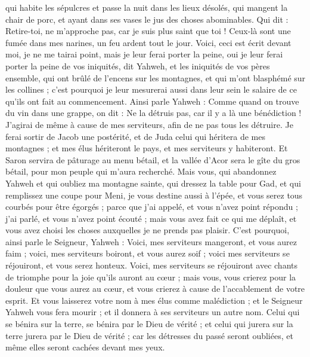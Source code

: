 \begin{multicols}{2}
qui habite les sépulcres et passe la nuit dans les lieux désolés, qui mangent la chair de porc, et ayant dans ses vases le jus des choses abominables.
Qui dit : Retire-toi, ne m'approche pas, car je suis plus saint que toi ! Ceux-là sont une fumée dans mes narines, un feu ardent tout le jour.
Voici, ceci est écrit devant moi, je ne me tairai point, mais je leur ferai porter la peine, oui je leur ferai porter la peine
de vos iniquités, dit Yahweh, et les iniquités de vos pères ensemble, qui ont brûlé de l'encens sur les montagnes, et qui m'ont blasphémé sur les collines ; c'est pourquoi je leur mesurerai aussi dans leur sein le salaire de ce qu'ils ont fait au commencement.
Ainsi parle Yahweh : Comme quand on trouve du vin dans une grappe, on dit : Ne la détruis pas, car il y a là une bénédiction ! J'agirai de même à cause de mes serviteurs, afin de ne pas tous les détruire.
Je ferai sortir de Jacob une postérité, et de Juda celui qui héritera de mes montagnes ; et mes élus hériteront le pays, et mes serviteurs y habiteront.
Et Saron servira de pâturage au menu bétail, et la vallée d'Acor sera le gîte du gros bétail, pour mon peuple qui m'aura recherché.
Mais vous, qui abandonnez Yahweh et qui oubliez ma montagne sainte, qui dressez la table pour Gad, et qui remplissez une coupe pour Meni,
je vous destine aussi à l'épée, et vous serez tous courbés pour être égorgés ; parce que j'ai appelé, et vous n'avez point répondu ; j'ai parlé, et vous n'avez point écouté ; mais vous avez fait ce qui me déplaît, et vous avez choisi les choses auxquelles je ne prends pas plaisir.
C'est pourquoi, ainsi parle le Seigneur, Yahweh : Voici, mes serviteurs mangeront, et vous aurez faim ; voici, mes serviteurs boiront, et vous aurez soif ; voici mes serviteurs se réjouiront, et vous serez honteux.
Voici, mes serviteurs se réjouiront avec chants de triomphe pour la joie qu'ils auront au cœur ; mais vous, vous crierez pour la douleur que vous aurez au cœur, et vous crierez à cause de l'accablement de votre esprit.
Et vous laisserez votre nom à mes élus comme malédiction ; et le Seigneur Yahweh vous fera mourir ; et il donnera à ses serviteurs un autre nom.
Celui qui se bénira sur la terre, se bénira par le Dieu de vérité ; et celui qui jurera sur la terre jurera par le Dieu de vérité ; car les détresses du passé seront oubliées, et même elles seront cachées devant mes yeux.

\end{multicols}
